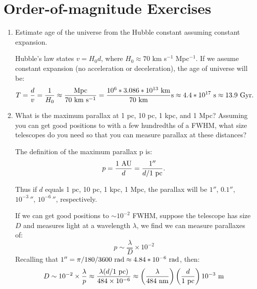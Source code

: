 \section{Order-of-magnitude Exercises}

\begin{enumerate} 
\item Estimate age of the universe from the Hubble constant assuming
    constant expansion.

\begin{answer}
Hubble's law states $v = H_0 d$, where $H_0\approx 70$ km s$^{-1}$
Mpc$^{-1}$. If we assume constant expansion (no acceleration or
deceleration), the age of universe will be:
\begin{equation}
T = \frac{d}{v}=\frac{1}{H_0}\approx
\frac{{\rm Mpc}}{70 {\rm ~km} {\rm ~s}^{-1}} =
\frac{10^6*3.086*10^{13} {\rm ~km}}{70 {\rm ~km}} {\rm s}\approx
4.4*10^{17} {\rm ~s}\approx 13.9 {\rm ~Gyr}.
\end{equation}
\end{answer}

\item What is the maximum parallax at 1 pc, 10 pc, 1 kpc, and 1 Mpc?
    Assuming you can get good positions to with a few hundredths of a
    FWHM, what size telescopes do you need so that you can measure
    parallax at these distances?

\begin{answer}
The definition of the maximum parallax p is:
\begin{equation}
    p = \frac{1 {\rm ~AU}}{d} = \frac{1''}{d / 1 {\rm ~pc}}.
\end{equation}

Thus if $d$ equals 1 pc, 10 pc, 1 kpc, 1 Mpc, the parallax will be
$1''$, $0.1''$, $10^{-3}\,''$, $10^{-6}\,''$, respectively. 

If we can get good positions to $\sim 10^{-2}$ FWHM, suppose the
telescope has size $D$ and measures light at a wavelength $\lambda$,
we find we can measure parallaxes of:
\begin{equation}
    p \sim \frac{\lambda}{D} \times 10^{-2}
\end{equation}
Recalling that $1'' = \pi / 180 / 3600 {\rm ~rad} \approx 4.84*10^{-6}
{\rm ~rad}$, then:
\begin{equation}
    D \sim 10^{-2} \times \frac{\lambda}{p}\approx \frac{\lambda (d /
    1 {\rm ~pc})}{484\times 10^{-6}} \approx
    \left(\frac{\lambda}{484 {\rm ~nm}}\right)
    \left(\frac{d}{1 {\rm ~pc}}\right) 10^{-3} {\rm ~m}
\end{equation}


\end{answer}
\end{enumerate}
